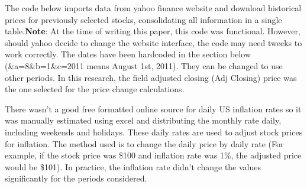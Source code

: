 \documentclass[english,man]{apa6}
\newenvironment{Shaded}{\begin{snugshade}}{\end{snugshade}}
\newcommand{\KeywordTok}[1]{\textcolor[rgb]{0.13,0.29,0.53}{\textbf{{#1}}}}
\newcommand{\DataTypeTok}[1]{\textcolor[rgb]{0.13,0.29,0.53}{{#1}}}
\newcommand{\DecValTok}[1]{\textcolor[rgb]{0.00,0.00,0.81}{{#1}}}
\newcommand{\StringTok}[1]{\textcolor[rgb]{0.31,0.60,0.02}{{#1}}}
\newcommand{\CommentTok}[1]{\textcolor[rgb]{0.56,0.35,0.01}{\textit{{#1}}}}
\newcommand{\OtherTok}[1]{\textcolor[rgb]{0.56,0.35,0.01}{{#1}}}
\newcommand{\NormalTok}[1]{{#1}}
\begin{document}
The code below imports data from yahoo finance website and download
historical prices for previously selected stocks, consolidating all
information in a single table.\textbf{Note}: At the time of writing this
paper, this code was functional. However, should yahoo decide to change
the website interface, the code may need tweeks to work correctly. The
dates have been hardcoded in the section below (\&a=8\&b=1\&c=2011 means
August 1st, 2011). They can be changed to use other periods. In this
research, the field adjusted closing (Adj Closing) price was the one
selected for the price change calculations.

\begin{Shaded}
\end{Shaded}

There wasn't a good free formatted online source for daily US inflation
rates so it was manually estimated using excel and distributing the
monthly rate daily, including weekends and holidays. These daily rates
are used to adjust stock prices for inflation. The method used is to
change the daily price by daily rate (For example, if the stock price
was \$100 and inflation rate was 1\%, the adjusted price would be
\$101). In practice, the inflation rate didn't change the values
significantly for the periods considered.
\end{document}
